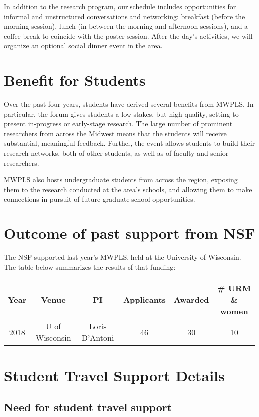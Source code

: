\documentclass[11pt]{article}
\begin{document}
In addition to the research program, our schedule includes
opportunities for informal and unstructured conversations and
networking: breakfast (before the morning session), lunch (in between
the morning and afternoon sessions), and a coffee break to coincide
with the poster session. After the day's activities, we will organize
an optional social dinner event in the area.

\section{Benefit for Students}

Over the past four years, students have derived several benefits from MWPLS. In particular, the forum gives students a low-stakes, but high quality, setting to present in-progress or early-stage research. The large number of prominent researchers from across the Midwest means that the students will receive substantial, meaningful feedback. Further, the event allows students to build their research networks, both of other students, as well as of faculty and senior researchers.

MWPLS also hosts undergraduate students from across the region, exposing them to the research conducted at the area's schools, and allowing them to make connections in pursuit of future graduate school opportunities.

\section{Outcome of past support from NSF}

The NSF supported last year's MWPLS, held at the University of Wisconsin. The table below summarizes the results of that funding:

\begin{tabular}{cccccc}
	Year & Venue & PI & Applicants & Awarded & \# URM \& women \\
	\hline
	2018 & U of Wisconsin & Loris D'Antoni & 46 & 30 & 10
\end{tabular}

\section{Student Travel Support Details}

\subsection{Need for student travel support}
\end{document}

